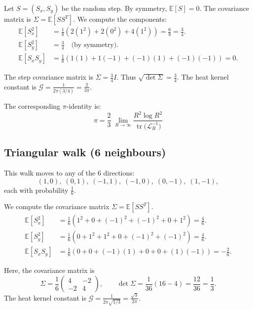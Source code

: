 \documentclass{article}
\numberwithin{equation}{section}
\theoremstyle{definition}
\theoremstyle{remark}
\newcommand{\cG}{\mathcal{G}}
\DeclareMathOperator{\tr}{tr}
\newcommand{\E}{\mathbb{E}}
\begin{document}
Let $S=(S_x, S_y)$ be the random step. By symmetry, $\E[S]=0$. The covariance matrix is $\Sigma = \E[S S^T]$. We compute the components:
\begin{align*}
\E[S_x^2] &= \frac{1}{8} \left( 2(1^2) + 2(0^2) + 4(1^2) \right) = \frac{6}{8} = \frac{3}{4}. \\
\E[S_y^2] &= \frac{3}{4} \quad \text{(by symmetry)}. \\
\E[S_x S_y] &= \frac{1}{8} \left( 1(1) + 1(-1) + (-1)(1) + (-1)(-1) \right) = 0.
\end{align*}

The step covariance matrix is $\Sigma = \tfrac{3}{4} I$. Thus $\sqrt{\det\Sigma} = \frac{3}{4}$.
The heat kernel constant is \( \cG = \frac{1}{2\pi (3/4)} = \frac{2}{3\pi} \).

The corresponding $\pi$-identity is:
\begin{equation}\label{eq:King_pi}
\boxed{\;\displaystyle \pi=\frac{2}{3}\;\lim_{R\to\infty}\frac{R^{2}\log R^{2}}{\tr\!\bigl(\mathcal{L}_R^{-1}\bigr)}\;}
\end{equation}

\subsection{Triangular walk (6 neighbours)}\label{app:tri}

This walk moves to any of the 6 directions:
\[
(1,0),\;(0,1),\;(-1,1),\;(-1,0),\;(0,-1),\;(1,-1),
\]
each with probability \( \tfrac16 \).

We compute the covariance matrix $\Sigma = \E[S S^T]$.
\begin{align*}
\E[S_x^2] &= \frac{1}{6} (1^2 + 0 + (-1)^2 + (-1)^2 + 0 + 1^2) = \frac{4}{6}. \\
\E[S_y^2] &= \frac{1}{6} (0 + 1^2 + 1^2 + 0 + (-1)^2 + (-1)^2) = \frac{4}{6}. \\
\E[S_x S_y] &= \frac{1}{6} (0 + 0 + (-1)(1) + 0 + 0 + (1)(-1)) = -\frac{2}{6}.
\end{align*}

Here, the covariance matrix is
\[
\Sigma
=\frac{1}{6}
\begin{pmatrix}
4 & -2 \\
-2 & 4
\end{pmatrix},
\qquad
\det\Sigma = \frac{1}{36}(16-4) = \frac{12}{36} = \frac{1}{3}.
\]
The heat kernel constant is $\cG = \frac{1}{2\pi\sqrt{1/3}} = \frac{\sqrt{3}}{2\pi}$.
\end{document}

